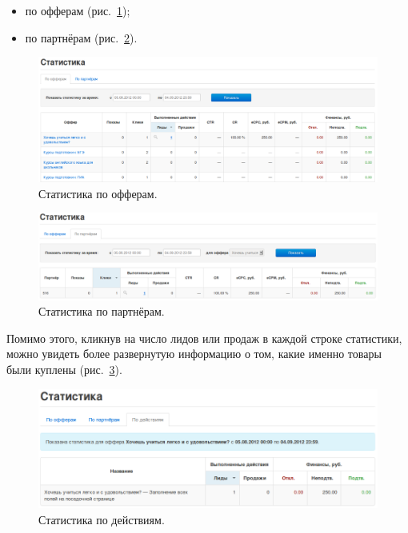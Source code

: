 \documentclass[a4paper,12pt]{article}
\begin{document}
\begin{itemize}
\item по офферам (рис.~\ref{fig:stats-offer});
\item по партнёрам (рис.~\ref{fig:stats-aff}).
\end{itemize}

\begin{figure}[!ht]
\centering
\includegraphics[width=\textwidth]{include/stats-offer.png}
\caption{Статистика по офферам.}
\label{fig:stats-offer}
\end{figure}

\begin{figure}[!ht]
\centering
\includegraphics[width=\textwidth]{include/stats-aff.png}
\caption{Статистика по партнёрам.}
\label{fig:stats-aff}
\end{figure}

Помимо этого, кликнув на число лидов или продаж в каждой строке статистики, можно увидеть более развернутую информацию о том, какие именно товары были куплены (рис.~\ref{fig:stats-suboffer}).

\begin{figure}[!ht]
\centering
\includegraphics[width=\textwidth]{include/stats-suboffer.png}
\caption{Статистика по действиям.}
\label{fig:stats-suboffer}
\end{figure}
\end{document}
